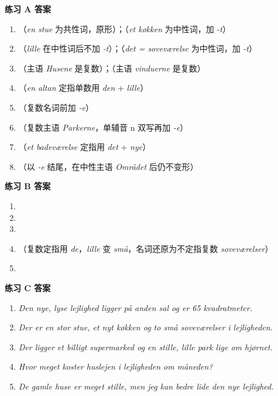 \begin{answerbox}
\textbf{练习 A 答案}
\begin{enumerate}
  \item {}（\textit{en stue} 为共性词，原形）；（\textit{et køkken} 为中性词，加 \textit{-t}）
  \item {}（\textit{lille} 在中性词后不加 \textit{-t}）；（\textit{det = soveværelse} 为中性词，加 \textit{-t}）
  \item {}（主语 \textit{Husene} 是复数）；（主语 \textit{vinduerne} 是复数）
  \item {}（\textit{en altan} 定指单数用 \textit{den} + \textit{lille}）
  \item {}（复数名词前加 \textit{-e}）
  \item {}（复数主语 \textit{Parkerne}，单辅音 n 双写再加 \textit{-e}）
  \item {}（\textit{et badeværelse} 定指用 \textit{det} + \textit{nye}）
  \item {}（以 \textit{-e} 结尾，在中性主语 \textit{Området} 后仍不变形）
\end{enumerate}

\textbf{练习 B 答案}
\begin{enumerate}
  \item {}
  \item {}
  \item {}
  \item {}（复数定指用 \textit{de}，\textit{lille} 变 \textit{små}，名词还原为不定指复数 \textit{soveværelser}）
  \item {}
\end{enumerate}

\textbf{练习 C 答案}
\begin{enumerate}
  \item \textit{Den nye, lyse lejlighed ligger på anden sal og er 65 kvadratmeter.}
  \item \textit{Der er en stor stue, et nyt køkken og to små soveværelser i lejligheden.}
  \item \textit{Der ligger et billigt supermarked og en stille, lille park lige om hjørnet.}
  \item \textit{Hvor meget koster huslejen i lejligheden om måneden?}
  \item \textit{De gamle huse er meget stille, men jeg kan bedre lide den nye lejlighed.}
\end{enumerate}


\end{answerbox}
